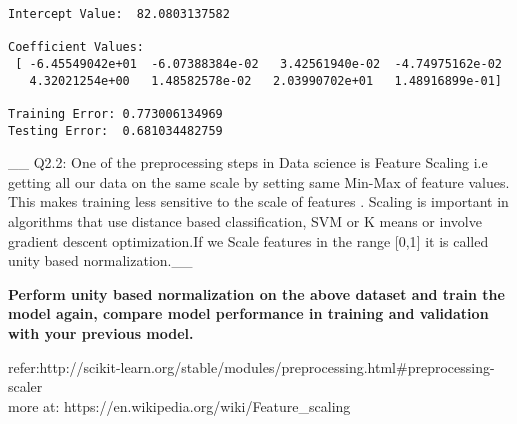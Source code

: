 \documentclass[11pt]{article}
\begin{document}
    \begin{Verbatim}[commandchars=\\\{\}]
Intercept Value:  82.0803137582 

Coefficient Values: 
 [ -6.45549042e+01  -6.07388384e-02   3.42561940e-02  -4.74975162e-02
   4.32021254e+00   1.48582578e-02   2.03990702e+01   1.48916899e-01]

Training Error: 0.773006134969
Testing Error:  0.681034482759

    \end{Verbatim}

    \_\_ Q2.2: One of the preprocessing steps in Data science is Feature
Scaling i.e getting all our data on the same scale by setting same
Min-Max of feature values. This makes training less sensitive to the
scale of features . Scaling is important in algorithms that use distance
based classification, SVM or K means or involve gradient descent
optimization.If we Scale features in the range {[}0,1{]} it is called
unity based normalization.\_\_

\textbf{Perform unity based normalization on the above dataset and train
the model again, compare model performance in training and validation
with your previous model.}

refer:http://scikit-learn.org/stable/modules/preprocessing.html\#preprocessing-scaler\\
more at: https://en.wikipedia.org/wiki/Feature\_scaling
\end{document}
